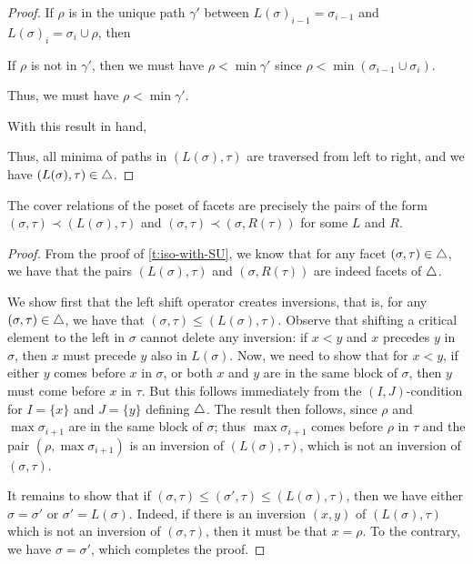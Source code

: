 \begin{proof}
If $\rho$ is in the unique path $\gamma'$ between $L(\sigma)_{i-1}=\sigma_{i-1}$ and $L(\sigma)_i=\sigma_i \cup \rho$, then 

If $\rho$ is not in  $\gamma'$, then we must have $\rho < \min \gamma'$ since $\rho < \min (\sigma_{i-1} \cup \sigma_i)$.


Thus, we must have $\rho < \min \gamma'$. 

With this result in hand, 

Thus, all minima of paths in $(L(\sigma), \tau)$ are traversed from left to right, and we have $(L(\sigma), \tau) \in \triangle$.
\end{proof}



\begin{proposition}
    \label{p:cover-relations}
    The cover relations of the poset of facets are precisely the pairs of the form $(\sigma,\tau) \prec (L(\sigma),\tau)$ and $(\sigma,\tau) \prec (\sigma,R(\tau))$ for some $L$ and $R$. 
\end{proposition}

\begin{proof} 
From the proof of \cref{t:iso-with-SU}, we know that for any facet $(\sigma,\tau) \in \triangle$, we have that the pairs $(L(\sigma),\tau)$ and $(\sigma,R(\tau))$ are indeed facets of $\triangle$. 

We show first that the left shift operator creates inversions, that is, for any $(\sigma, \tau) \in \triangle$, we have that $(\sigma,\tau) \leq (L(\sigma),\tau)$. 
Observe that shifting a critical element to the left in $\sigma$ cannot delete any inversion: if $x<y$ and $x$ precedes $y$ in $\sigma$, then $x$ must precede $y$ also in $L(\sigma)$. 
Now, we need to show that for $x<y$, if either $y$ comes before $x$ in $\sigma$, or both $x$ and $y$ are in the same block of $\sigma$, then $y$ must come before $x$ in $\tau$. 
But this follows immediately from the $(I,J)$-condition for $I=\{x\}$ and $J=\{y\}$ defining $\triangle$. 
The result then follows, since $\rho$ and $\max \sigma_{i+1}$ are in the same block of $\sigma$; thus $\max \sigma_{i+1}$ comes before $\rho$ in $\tau$ and the pair $(\rho,\max \sigma_{i+1})$ is an inversion of $(L(\sigma),\tau)$, which is not an inversion of $(\sigma,\tau)$. 

It remains to show that if $(\sigma,\tau) \leq (\sigma',\tau) \leq (L(\sigma),\tau)$, then we have either $\sigma=\sigma'$ or $\sigma'=L(\sigma)$. 
Indeed, if there is an inversion $(x,y)$ of $(L(\sigma),\tau)$ which is not an inversion of $(\sigma,\tau)$, then it must be that $x=\rho$. 
To the contrary, we have $\sigma=\sigma'$, which completes the proof. 
\end{proof}

